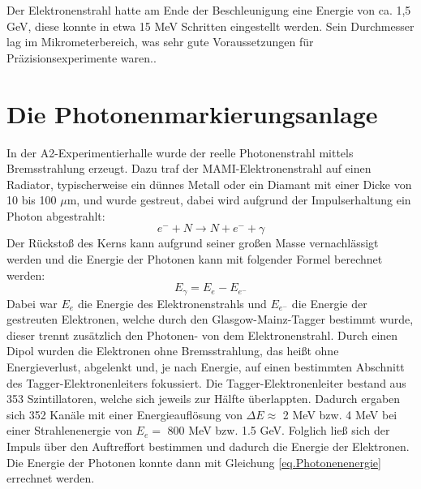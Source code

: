 \documentclass[a4paper,11pt,oneside,final,german,openbib,pdftex]{scrbook}
\begin{document}
 Der Elektronenstrahl hatte am Ende der Beschleunigung eine Energie von ca. 1,5 GeV, diese konnte in etwa 15 MeV Schritten eingestellt werden. Sein Durchmesser lag im Mikrometerbereich, was sehr gute Voraussetzungen f\"ur Pr\"azisionsexperimente waren.\cite{KPh07}. 
 
 
 \section{Die Photonenmarkierungsanlage}
 
 In der A2-Experimentierhalle wurde der reelle Photonenstrahl mittels Bremsstrahlung erzeugt. Dazu traf der MAMI-Elektronenstrahl auf einen Radiator, typischerweise ein d\"unnes Metall oder ein Diamant mit einer Dicke von 10 bis 100 $\mu$m, und wurde gestreut, dabei wird aufgrund der Impulserhaltung ein Photon abgestrahlt:
 \begin{equation}
 e^{-}+N\rightarrow N + e^{-}+\gamma
 \label{eq.Streuung}
 \end{equation}
  Der R\"ucksto{\ss} des Kerns kann aufgrund seiner gro{\ss}en Masse vernachl\"assigt werden und die Energie der Photonen kann mit folgender Formel berechnet werden:
  \begin{equation}
  E_{\gamma}= E_{e^{}}-E_{e^-}
  \label{eq.Photonenenergie}
  \end{equation}
 Dabei war $E_e$ die Energie des Elektronenstrahls und $E_{e^-}$ die Energie der gestreuten Elektronen, welche durch den Glasgow-Mainz-Tagger bestimmt wurde, dieser trennt zus\"atzlich den Photonen- von dem Elektronenstrahl. Durch einen Dipol wurden die Elektronen ohne Bremsstrahlung, das hei{\ss}t ohne Energieverlust, abgelenkt und, je nach Energie, auf einen bestimmten Abschnitt des Tagger-Elektronenleiters fokussiert. Die Tagger-Elektronenleiter bestand aus 353 Szintillatoren, welche sich jeweils zur H\"alfte \"uberlappten. Dadurch ergaben sich 352 Kan\"ale mit einer Energieaufl\"osung von $\Delta E \approx$  2 MeV bzw. 4 MeV bei einer Strahlenenergie von $E_e=$ 800 MeV bzw. 1.5 GeV. Folglich lie{\ss} sich der Impuls \"uber den Auftreffort bestimmen und dadurch die Energie der Elektronen. Die Energie der Photonen konnte dann mit Gleichung \ref{eq.Photonenenergie} errechnet werden.
\newline 
\end{document}
